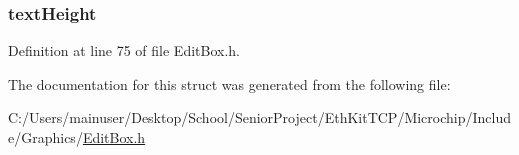 \subsubsection[{text\+Height}]{ text\+Height}\label{struct_e_d_i_t_b_o_x_a40fa9c35391b0005032180b85e7afd34}


Definition at line 75 of file Edit\+Box.\+h.



The documentation for this struct was generated from the following file\+:\begin{DoxyCompactItemize}
\item 
C\+:/\+Users/mainuser/\+Desktop/\+School/\+Senior\+Project/\+Eth\+Kit\+T\+C\+P/\+Microchip/\+Include/\+Graphics/\hyperlink{_edit_box_8h}{Edit\+Box.\+h}\end{DoxyCompactItemize}
